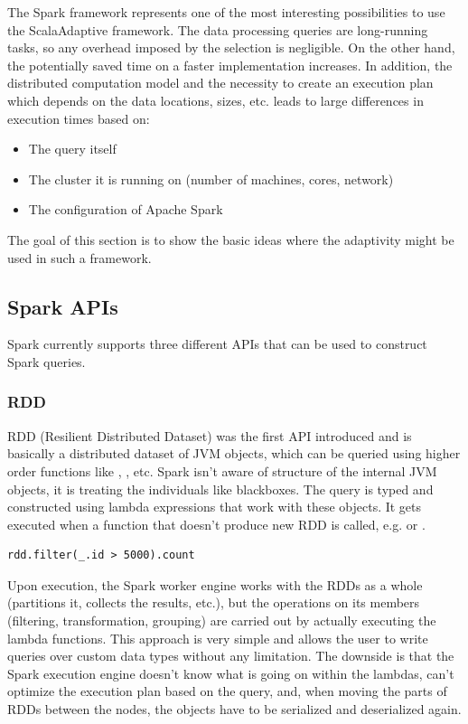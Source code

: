 The Spark framework represents one of the most interesting possibilities to use the ScalaAdaptive framework. The data processing queries are long-running tasks, so any overhead imposed by the selection is negligible. On the other hand, the potentially saved time on a faster implementation increases. In addition, the distributed computation model and the necessity to create an execution plan which depends on the data locations, sizes, etc. leads to large differences in execution times based on:

\begin{itemize}
	\item The query itself
	\item The cluster it is running on (number of machines, cores, network)
	\item The configuration of Apache Spark
\end{itemize}

The goal of this section is to show the basic ideas where the adaptivity might be used in such a framework.

\subsection{Spark APIs}
\label{subsec:spark_apis}

Spark currently supports three different APIs that can be used to construct Spark queries.

\subsubsection{RDD}

RDD (Resilient Distributed Dataset) was the first API introduced and is basically a distributed dataset of JVM objects, which can be queried using higher order functions like , , etc. Spark isn't aware of structure of the internal JVM objects, it is treating the individuals like blackboxes. The query is typed and constructed using lambda expressions that work with these objects. It gets executed when a function that doesn't produce new RDD is called, e.g.  or . 

\lstset{style=Scala}
\begin{lstlisting}
rdd.filter(_.id > 5000).count
\end{lstlisting}

Upon execution, the Spark worker engine works with the RDDs as a whole (partitions it, collects the results, etc.), but the operations on its members (filtering, transformation, grouping) are carried out by actually executing the lambda functions. This approach is very simple and allows the user to write queries over custom data types without any limitation. The downside is that the Spark execution engine doesn't know what is going on within the lambdas, can't optimize the execution plan based on the query, and, when moving the parts of RDDs between the nodes, the objects have to be serialized and deserialized again.


